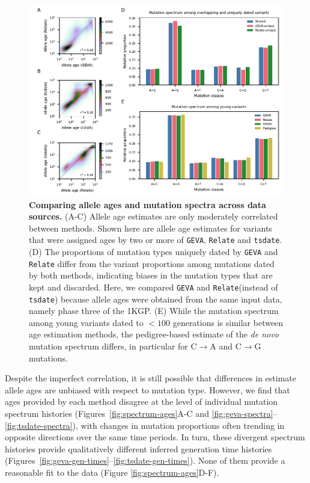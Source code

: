 \documentclass[]{article}
\newcommand{\GEVA}{\texttt{GEVA}\xspace}
\newcommand{\tsdate}{\texttt{tsdate}\xspace}
\newcommand{\relate}{\texttt{Relate}\xspace}
\begin{document}
\begin{figure}[t!]
    \centering
    \includegraphics{../plots/fig2.pdf}
    \caption{
        \textbf{Comparing allele ages and mutation spectra across data
        sources.} (A-C) Allele age estimates are only moderately correlated
        between methods. Shown here are allele age estimates for variants that
        were assigned ages by two or more of \GEVA, \relate and \tsdate. (D)
        The proportions of mutation types uniquely dated by \GEVA and \relate
        differ from the variant proportions among mutations dated by both
        methods, indicating biases in the mutation types that are kept and
        discarded. Here, we compared \GEVA and \relate (instead of \tsdate)
        because allele ages were obtained from the same input data, namely
        phase three of the 1KGP.
        (E) While the mutation spectrum among young variants dated
        to $<100$ generations is similar between age estimation methods,
        the pedigree-based estimate of the \emph{de novo} mutation spectrum
        \citep{jonsson2017parental} differs, in particular for C$\rightarrow$A
        and C$\rightarrow$G mutations.
    }
    \label{fig:data-comp}
\end{figure}

Despite the imperfect correlation, it is still possible that differences in
estimate allele ages are unbiased with respect to mutation type.
However, we find that ages provided by each method disagree
at the level of individual mutation
spectrum histories (Figures~\ref{fig:spectrum-ages}A-C and
\ref{fig:geva-spectra}--\ref{fig:tsdate-spectra}), with 
changes in mutation proportions
often trending in opposite directions over the same time periods. In
turn, these divergent spectrum histories provide qualitatively different
inferred generation time histories
(Figures~\ref{fig:geva-gen-times}--\ref{fig:tsdate-gen-times}). None
of them provide a reasonable fit to the data (Figure
\ref{fig:spectrum-ages}D-F).
\end{document}
